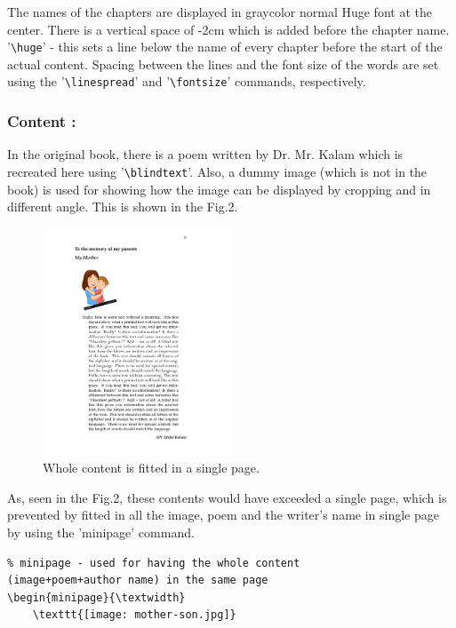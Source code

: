 \documentclass[runningheads]{llncs}
\begin{document}
The names of the chapters are displayed in graycolor normal Huge font at the center. There is a vertical space of -2cm which is added before the chapter name. '\texttt{\textbraceleft\textbackslash huge}' - this sets a line below the name of every chapter before the start of the actual content. Spacing between the lines and the font size of the words are set using the '\texttt{\textbackslash linespread}' and '\texttt{\textbackslash fontsize}' commands, respectively.


\subsubsection{Content : }
In the original book, there is a poem written by Dr. Mr. Kalam which is recreated here using '\texttt{\textbackslash blindtext}'. Also, a dummy image (which is not in the book) is used for showing how the image can be displayed by cropping and in different angle. This is shown in the Fig.2.

\begin{figure}[H]
    \centering
    \includegraphics[width=0.5\textwidth]{Poem.jpg}
    \caption{Whole content is fitted in a single page.}
\end{figure}

As, seen in the Fig.2, these contents would have exceeded a single page, which is prevented by fitted in all the image, poem and the writer's name in single page by using the 'minipage' command. 

\begin{verbatim}
% minipage - used for having the whole content  
(image+poem+author name) in the same page
\begin{minipage}{\textwidth}
	\texttt{[image: mother-son.jpg]}
\end{verbatim}
\end{document}
